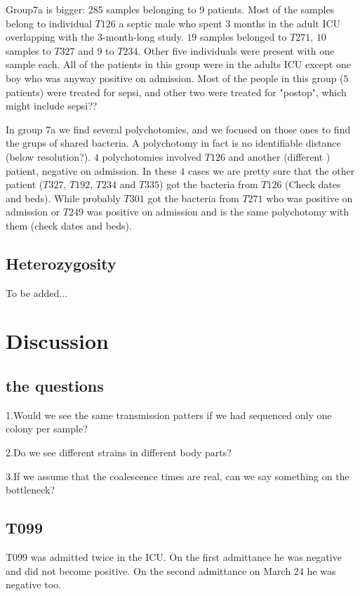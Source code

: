\documentclass[12pt,a4paper]{article}
\begin{document}
Group7a is bigger: 285 samples belonging to 9 patients. Most of the samples belong to individual $T126$ a septic male who spent 3 months in the adult ICU overlapping with the 3-month-long study. $19$ samples belonged to $T271$, $10$ samples to $T327$ and $9$ to $T234$. Other five individuals were present with one sample each. 
All of the patients in this group were in the adults ICU except one boy who was anyway positive on admission. 
Most of the people in this group ($5$ patients) were treated for sepsi, and other two were treated for "postop", which might include sepsi??

In group 7a we find several polychotomies, and we focused on those ones to find the grups of shared bacteria.
A polychotomy in fact is no identifiable distance (below resolution?). 
$4$ polychotomies involved $T126$ and another (different ) patient, negative on admission. In these $4$ cases we are pretty sure that the other patient ($T327$, $T192$, $T234$ and $T335$) got the bacteria from $T126$ (Check dates and beds). While probably $T301$ got the bacteria from $T271$ who was positive on admission or $T249$ was positive on admission and is the same polychotomy with them (check dates and beds).
 


\subsection{Heterozygosity}

To be added...

\section{Discussion}
\subsection{the questions}
1.Would we see the same transmission patters if we had sequenced only one colony per sample?

2.Do we see different strains in different body parts?

3.If we assume that the coalescence times are real, can we say something on the bottleneck?

\subsection{T099}
T099 was admitted twice in the ICU. On the first admittance he was negative and did not become positive. On the second admittance on March 24 he was negative too. 
\end{document}
